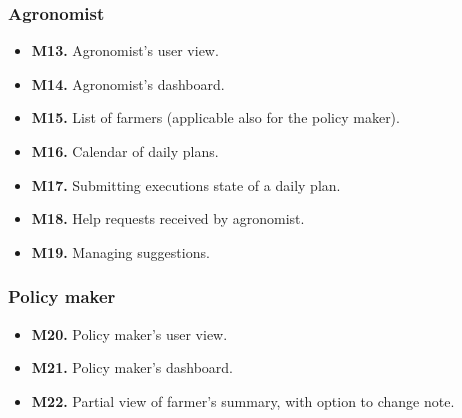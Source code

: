 \subsubsection{Agronomist}

\begin{itemize}
    \item \textbf{M13.} Agronomist's user view.
    \item \textbf{M14.} Agronomist's dashboard.
    \item \textbf{M15.} List of farmers (applicable also for the policy maker).
    \item \textbf{M16.} Calendar of daily plans.
    \item \textbf{M17.} Submitting executions state of a daily plan.
    \item \textbf{M18.} Help requests received by agronomist.
    \item \textbf{M19.} Managing suggestions.
\end{itemize}

\subsubsection{Policy maker}

\begin{itemize}
    \item \textbf{M20.} Policy maker's user view.
    \item \textbf{M21.} Policy maker's dashboard.
    \item \textbf{M22.} Partial view of farmer's summary, with option to change note.
\end{itemize}
